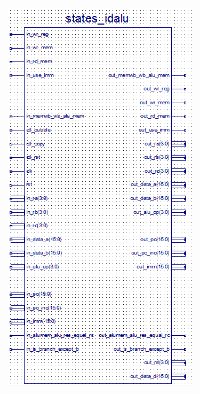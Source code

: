 \begin{center}
    \includegraphics[height=10cm]{image/detail/detail_idalu.png}
    \label{fig:idalu}
\end{center}

